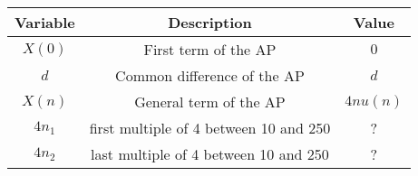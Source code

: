 \begin{tabular}[12.1pt]{ |c| c| c|}
    \hline
    \textbf{Variable} & \textbf{Description} &\textbf{Value}\\ 
    \hline
    $X(0)$ & First term of the AP & $0$ \\
    \hline 
    $d$ & Common difference of the AP &$d$ \\
    \hline 
    $X(n)$ & General term of the AP & $4nu(n)$\\
    \hline
    $4n_{1}$ & first multiple of 4 between 10 and 250 & ?\\
    \hline
    $4n_{2}$ & last multiple of 4 between 10 and 250 & ?\\
    \hline
    \end{tabular}
